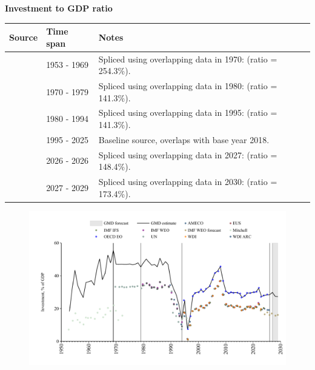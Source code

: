 \documentclass[12pt,a4paper,landscape]{article}
\begin{document}
\begin{adjustbox}{max totalsize={\paperwidth}{\paperheight},center}
\begin{minipage}[t][\textheight][t]{\textwidth}
\vspace*{0.5cm}
{}
\begin{center}
{\Large\bfseries Investment to GDP ratio}
\end{center}
\vspace{0.5cm}
\begin{table}[H]
\centering
\small
\begin{tabular}{|l|l|l|}
\hline
\textbf{Source} & \textbf{Time span} & \textbf{Notes} \\
\hline
\rowcolor{white}\cite{Mitchell}& 1953 - 1969 &Spliced using overlapping data in 1970: (ratio = 254.3\%). \\
\rowcolor{lightgray}\cite{UN}& 1970 - 1979 &Spliced using overlapping data in 1980: (ratio = 141.3\%). \\
\rowcolor{white}\cite{WDI}& 1980 - 1994 &Spliced using overlapping data in 1995: (ratio = 141.3\%). \\
\rowcolor{lightgray}\cite{OECD_EO}& 1995 - 2025 &Baseline source, overlaps with base year 2018. \\
\rowcolor{white}\cite{AMECO}& 2026 - 2026 &Spliced using overlapping data in 2027: (ratio = 148.4\%). \\
\rowcolor{lightgray}\cite{IMF_WEO_forecast}& 2027 - 2029 &Spliced using overlapping data in 2030: (ratio = 173.4\%). \\
\hline
\end{tabular}
\end{table}
\begin{figure}[H]
\centering
\includegraphics[width=\textwidth,height=0.6\textheight,keepaspectratio]{graphs/BGR_inv_GDP.pdf}
\end{figure}
\end{minipage}
\end{adjustbox}
\end{document}
